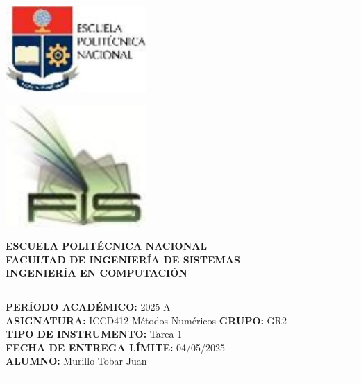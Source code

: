 \documentclass[12pt]{article}
\begin{document}
\begin{minipage}{0.45\textwidth}
    \includegraphics[width=0.4\textwidth]{inFiles/Figures/epnLogo.jpg}
\end{minipage}
\hfill
\begin{minipage}{0.45\textwidth}
    \raggedleft
    \includegraphics[width=0.4\textwidth]{inFiles/Figures/FIS_logo.jpg}
\end{minipage}

\vspace{0.5cm}

\begin{center}
    \textbf{ESCUELA POLITÉCNICA NACIONAL}\\[0.2cm]
    \textbf{FACULTAD DE INGENIERÍA DE SISTEMAS}\\[0.2cm]
    \textbf{INGENIERÍA {\textbf{EN COMPUTACIÓN}}}
\end{center}

\vspace{0.5cm}
\hrule
\vspace{0.5cm}

\noindent\textbf{PERÍODO ACADÉMICO:} 2025-A\\[0.2cm]
\noindent\textbf{ASIGNATURA:} ICCD412 Métodos Numéricos \hfill \textbf{GRUPO:} GR2\\[0.2cm]
\noindent\textbf{TIPO DE INSTRUMENTO:} Tarea 1\\[0.2cm]
\noindent\textbf{FECHA DE ENTREGA LÍMITE:} 04/05/2025\\[0.2cm]
\noindent\textbf{ALUMNO:} Murillo Tobar Juan

\vspace{0.5cm}
\hrule
\vspace{1cm}
\end{document}
